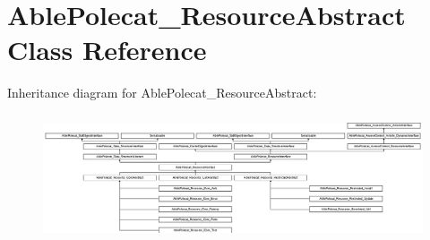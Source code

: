 \hypertarget{class_able_polecat___resource_abstract}{}\section{Able\+Polecat\+\_\+\+Resource\+Abstract Class Reference}
\label{class_able_polecat___resource_abstract}
Inheritance diagram for Able\+Polecat\+\_\+\+Resource\+Abstract\+:\begin{figure}[H]
\begin{center}
\leavevmode
\includegraphics[height=3.756098cm]{class_able_polecat___resource_abstract}
\end{center}
\end{figure}
